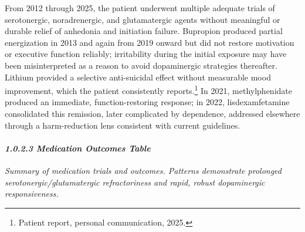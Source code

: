 From 2012 through 2025, the patient underwent multiple adequate trials of serotonergic, noradrenergic, and glutamatergic agents without meaningful or durable relief of anhedonia and initiation failure. Bupropion produced partial energization in 2013 and again from 2019 onward but did not restore motivation or executive function reliably; irritability during the initial exposure may have been misinterpreted as a reason to avoid dopaminergic strategies thereafter. Lithium provided a selective anti-suicidal effect without measurable mood improvement, which the patient consistently reports.\footnote{Patient report, personal communication, 2025.} In 2021, methylphenidate produced an immediate, function-restoring response; in 2022, lisdexamfetamine consolidated this remission, later complicated by dependence, addressed elsewhere through a harm-reduction lens consistent with current guidelines.

\paragraph{\texorpdfstring{\emph{1.0.2.3 Medication Outcomes Table}}{1.0.2.3 Medication Outcomes Table}}\label{10b_traad-medication-outcomes-table}

\emph{Summary of medication trials and outcomes. Patterns demonstrate prolonged serotonergic/glutamatergic refractoriness and rapid, robust dopaminergic responsiveness.}

